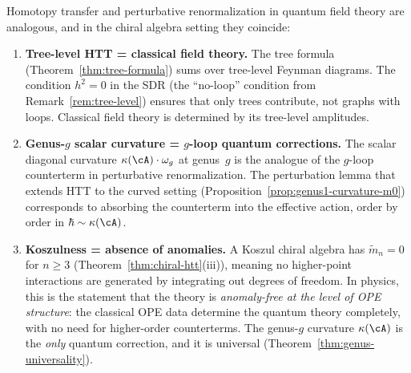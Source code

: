 \begin{remark}
\label{rem:renormalization-htt}
Homotopy transfer and
perturbative renormalization in quantum field theory are analogous, and in the chiral algebra setting they coincide:

\begin{enumerate}[label=(\roman*)]
\item \textbf{Tree-level HTT = classical field theory.}
The tree formula (Theorem~\ref{thm:tree-formula}) sums over
tree-level Feynman diagrams. The condition $h^2 = 0$ in the SDR
(the ``no-loop'' condition from Remark~\ref{rem:tree-level})
ensures that only trees contribute, not graphs with loops.
Classical field theory is determined by its tree-level amplitudes.

\item \textbf{Genus-$g$ scalar curvature = $g$-loop quantum corrections.}
The scalar diagonal curvature $\kappa(\cA) \cdot \omega_g$ at genus~$g$ is the
analogue of the $g$-loop counterterm in perturbative
renormalization. The perturbation lemma that extends HTT to
the curved setting (Proposition~\ref{prop:genus1-curvature-m0})
corresponds to absorbing the counterterm into the effective
action, order by order in $\hbar \sim \kappa(\cA)$.

\item \textbf{Koszulness = absence of anomalies.}
A Koszul chiral algebra has $\tilde{m}_n = 0$ for $n \geq 3$
(Theorem~\ref{thm:chiral-htt}(iii)), meaning no higher-point
interactions are generated by integrating out degrees of freedom.
In physics, this is the statement that the theory is
\emph{anomaly-free at the level of OPE structure}: the classical
OPE data determine the quantum theory completely, with no need
for higher-order counterterms. The genus-$g$ curvature $\kappa(\cA)$
is the \emph{only} quantum correction, and it is universal
(Theorem~\ref{thm:genus-universality}).
\end{enumerate}
\end{remark}
